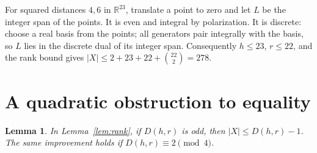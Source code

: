 \documentclass[11pt]{article}
\newtheorem{lemma}[theorem]{Lemma}
\newcommand{\RR}{\mathbb R}
\begin{document}
For squared distances $4,6$ in $\RR^{23}$, translate a point to zero and let $L$ be the integer span of the points. It is even and integral by polarization. It is discrete: choose a real basis from the points; all generators pair integrally with the basis, so $L$ lies in the discrete dual of its integer span. Consequently $h\le23$, $r\le22$, and the rank bound gives $|X|\le2+23+22+\binom{22}{2}=278$.

\section{A quadratic obstruction to equality}
\begin{lemma}\label{lem:refine}
In Lemma~\ref{lem:rank}, if $D(h,r)$ is odd, then $|X|\le D(h,r)-1$. The same improvement holds if $D(h,r)\equiv2\pmod4$.
\end{lemma}
\end{document}
